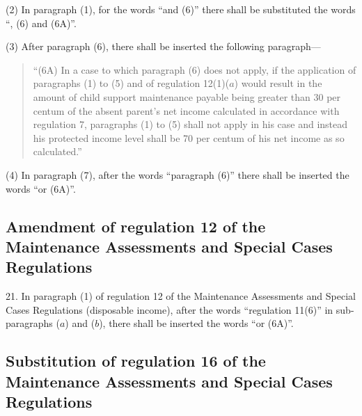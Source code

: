 \documentclass[a4paper]{article}
\begin{document}
(2) In paragraph (1), for the words “and (6)” there shall be substituted the words “, (6) and (6A)”.

(3) After paragraph (6), there shall be inserted the following paragraph—
\begin{quotation}
“(6A) In a case to which paragraph (6) does not apply, if the application of paragraphs (1) to (5) and of regulation 12(1)($a$) would result in the amount of child support maintenance payable being greater than 30 per centum of the absent parent’s net income calculated in accordance with regulation 7, paragraphs (1) to (5) shall not apply in his case and instead his protected income level shall be 70 per centum of his net income as so calculated.”
\end{quotation}

(4) In paragraph (7), after the words “paragraph (6)” there shall be inserted the words “or (6A)”.

\subsection[21. Amendment of regulation 12 of the Maintenance Assessments and Special Cases Regulations]{Amendment of regulation 12 of the Maintenance Assessments and Special Cases Regulations}

21.  In paragraph (1) of regulation 12 of the Maintenance Assessments and Special Cases Regulations (disposable income), after the words “regulation 11(6)” in sub-paragraphs ($a$) and ($b$), there shall be inserted the words “or (6A)”.

\subsection[22. Substitution of regulation 16 of the Maintenance Assessments and Special Cases Regulations]{Substitution of regulation 16 of the Maintenance Assessments and Special Cases Regulations}
\end{document}

